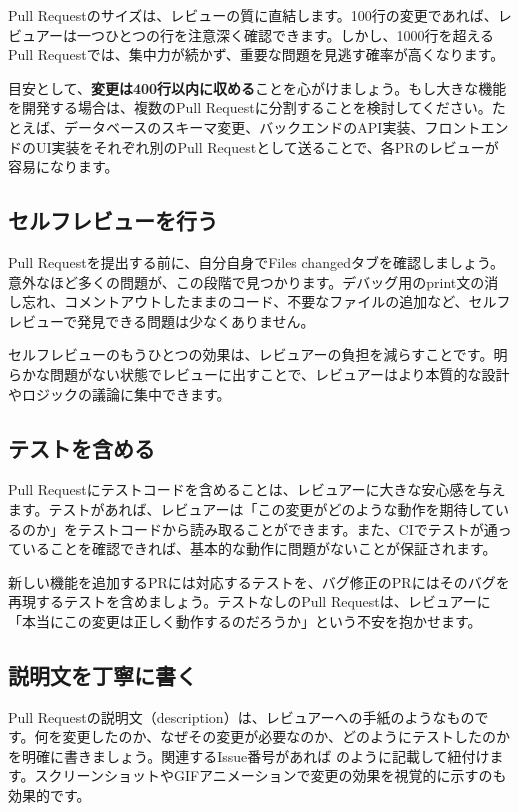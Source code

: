 Pull Requestのサイズは、レビューの質に直結します。100行の変更であれば、レビュアーは一つひとつの行を注意深く確認できます。しかし、1000行を超えるPull Requestでは、集中力が続かず、重要な問題を見逃す確率が高くなります。

目安として、\textbf{変更は400行以内に収める}ことを心がけましょう。もし大きな機能を開発する場合は、複数のPull Requestに分割することを検討してください。たとえば、データベースのスキーマ変更、バックエンドのAPI実装、フロントエンドのUI実装をそれぞれ別のPull Requestとして送ることで、各PRのレビューが容易になります。

\subsection{セルフレビューを行う}

Pull Requestを提出する前に、自分自身でFiles changedタブを確認しましょう。意外なほど多くの問題が、この段階で見つかります。デバッグ用のprint文の消し忘れ、コメントアウトしたままのコード、不要なファイルの追加など、セルフレビューで発見できる問題は少なくありません。

セルフレビューのもうひとつの効果は、レビュアーの負担を減らすことです。明らかな問題がない状態でレビューに出すことで、レビュアーはより本質的な設計やロジックの議論に集中できます。

\subsection{テストを含める}

Pull Requestにテストコードを含めることは、レビュアーに大きな安心感を与えます。テストがあれば、レビュアーは「この変更がどのような動作を期待しているのか」をテストコードから読み取ることができます。また、CIでテストが通っていることを確認できれば、基本的な動作に問題がないことが保証されます。

新しい機能を追加するPRには対応するテストを、バグ修正のPRにはそのバグを再現するテストを含めましょう。テストなしのPull Requestは、レビュアーに「本当にこの変更は正しく動作するのだろうか」という不安を抱かせます。

\subsection{説明文を丁寧に書く}

Pull Requestの説明文（description）は、レビュアーへの手紙のようなものです。何を変更したのか、なぜその変更が必要なのか、どのようにテストしたのかを明確に書きましょう。関連するIssue番号があれば  のように記載して紐付けます。スクリーンショットやGIFアニメーションで変更の効果を視覚的に示すのも効果的です。

